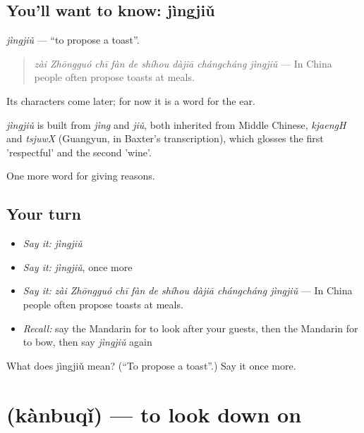 \subsection*{You'll want to know: jìngjiǔ}
\emph{jìngjiǔ} — \textquotedblleft{}to propose a toast\textquotedblright{}.

\begin{quote}
\emph{zài Zhōngguó chī fàn de shíhou dàjiā chángcháng jìngjiǔ} — In China people often propose toasts at meals.
\end{quote}

Its characters come later; for now it is a word for the ear.

\begin{cousinweb}
\emph{jìngjiǔ} is built from \emph{jìng} and \emph{jiǔ}, both inherited from Middle Chinese, \emph{kjaengH} and \emph{tsjuwX} (Guangyun, in Baxter's transcription), which glosses the first 'respectful' and the second 'wine'.
\end{cousinweb}

\begin{grammarlens}[title={What you've built}]
One more word for giving reasons.
\end{grammarlens}

\subsection*{Your turn}
\begin{itemize}
\raggedright
  \item \emph{Say it:} \emph{jìngjiǔ}
  \item \emph{Say it:} \emph{jìngjiǔ}, once more
  \item \emph{Say it:} \emph{zài Zhōngguó chī fàn de shíhou dàjiā chángcháng jìngjiǔ} — In China people often propose toasts at meals.
  \item \emph{Recall:} say the Mandarin for to look after your guests, then the Mandarin for to bow, then say \emph{jìngjiǔ} again
\end{itemize}

\begin{tcolorbox}[breakable,colback=teal!4,colframe=teal!35!black,title={Before you move on}]
What does jìngjiǔ mean? (\textquotedblleft{}To propose a toast\textquotedblright{}.) Say it once more.
\end{tcolorbox}
\section[\texorpdfstring{\zh{看不起} (kànbuqǐ)}{看不起 (kànbuqǐ)}]{ (kànbuqǐ) — to look down on}

